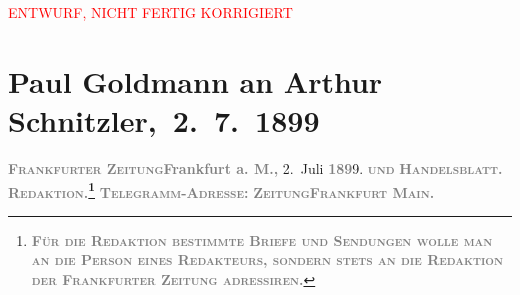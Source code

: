 
\begin{center}
            \textcolor{red}{ENTWURF, NICHT FERTIG KORRIGIERT}
                      \end{center}
            
         
         \renewcommand{\erwaehntePersonen}{Personen: Alfred Dreyfus}
         \renewcommand{\erwaehnteInstitutionen}{Institutionen: Frankfurter Zeitung}
         \renewcommand{\erwaehnteOrte}{Orte: Belišće, Budapest, Engadin, Frankfurt am Main, Orahovica, Paris, Rennes, Schweiz, Slawonien, Wien, Österreich}
         \renewcommand{\erwaehnteWerke}{}
               \section[ Paul Goldmann an Arthur Schnitzler, 2. 7. 1899]{ Paul Goldmann an Arthur Schnitzler, 2. 7. 1899}\nopagebreak{}\rehead{ }\begin{ledgroupsized}[t]{13cm}\normalsize\beginnumbering \toendnotes[C]{\smallbreak\pagebreak[2]} 
\toendnotes[C]{\smallbreak}\pstart
           \noindent{}{\pb}\textcolor{gray}{\textbf{\textsc{Frankfurter Zeitung}}}\hfill \textcolor{gray}{\textbf{Frankfurt a. M.,}}{ }2. Juli \textcolor{gray}{\textbf{189}}9.\pend
           \pstart
           \textsc{\textcolor{gray}{\textbf{und}}}\pend
           \pstart
           \textcolor{gray}{\textbf{\textsc{Handelsblatt.}}}\pend
           \pstart
           \textcolor{gray}{\textbf{\textsc{Redaktion.\footnote{\noindent{}\textcolor{gray}{\textbf{\textsc{Für die Redaktion beſtimmte Briefe und Sendungen
                                    wolle man  an die Perſon eines
                                    Redakteurs, ſondern ſtets \textbf{an die Redaktion der
                                          Frankfurter Zeitung} adreſſiren.}}}}}}}\pend
           \pstart
           \textcolor{gray}{\textbf{\textsc{Telegramm-Adreſſe:}}}\pend
           \pstart
           \textcolor{gray}{\textbf{\textsc{ZeitungFrankfurt Main.}}}\pend

\end{ledgroupsized}
